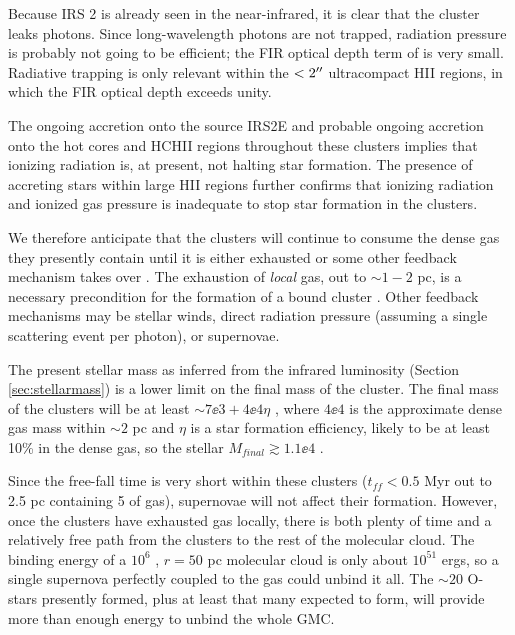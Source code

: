 Because IRS 2 is already seen in the near-infrared, it is clear that
the cluster leaks photons.  Since long-wavelength photons are not trapped,
radiation pressure is probably not going to be efficient; the FIR optical depth
term of \citet{Murray2010a} is very small.  Radiative trapping is only
relevant within the $<2\mbox{$^{\prime\prime}$}$ ultracompact HII regions, in which the FIR optical
depth exceeds unity.

The ongoing accretion onto the source IRS2E and probable ongoing accretion onto
the hot cores and HCHII regions throughout these clusters implies that ionizing
radiation is, at present, not halting star formation.  The presence of
accreting stars within large HII regions further confirms that ionizing
radiation and ionized gas pressure is inadequate to stop star formation in the
clusters.

We therefore anticipate that the clusters will continue to consume the dense
gas they presently contain until it is either exhausted or some other feedback
mechanism takes over \citep{Ginsburg2012a,Bressert2012a,Ginsburg2015a}.  The
exhaustion of \emph{local} gas, out to $\sim1-2$ pc, is a necessary
precondition for the formation of a bound cluster \citep{Kruijssen2012a}.
Other feedback mechanisms may be stellar winds, direct radiation pressure
(assuming a single scattering event per photon), or supernovae.

The present stellar mass as inferred from the infrared luminosity (Section
\ref{sec:stellarmass}) is a lower limit on the final mass of the cluster.  The
final mass of the clusters will be at least $\sim7\ee{3} + 4\ee{4} \eta$ \msun,
where $4\ee{4}$ \msun is the approximate dense gas mass within $\sim2$ pc and
$\eta$ is a star formation efficiency, likely to be at least 10\% in the dense
gas, so the stellar $M_{final} \gtrsim 1.1\ee{4}$ \msun.

Since the free-fall time is very short within these clusters ($t_{ff} < 0.5$
Myr out to 2.5 pc containing 5 \msun of gas), supernovae will not affect
their formation.  However, once the clusters have exhausted gas locally, there
is both plenty of time and a relatively free path from the clusters to the rest
of the molecular cloud.  The binding energy of a $10^6$ \msun, $r=50$ pc 
molecular cloud is only about $10^{51}$ ergs, so a single supernova perfectly
coupled to the gas could unbind it all.  The $\sim20$ O-stars presently formed,
plus at least that many expected to form, will provide more than enough energy
to unbind the whole GMC.

